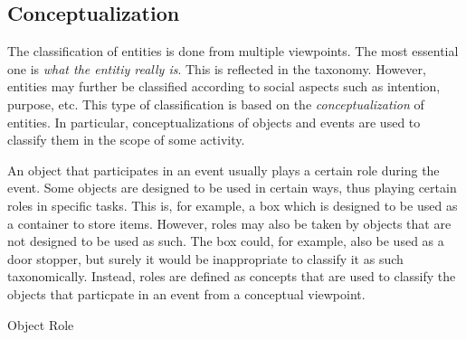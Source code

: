 \subsection{Conceptualization}
\label{sec:classification}

The classification of entities is done from multiple viewpoints.
The most essential one is \emph{what the entitiy really is}.
This is reflected in the taxonomy.
However, entities may further be classified according to social aspects such as intention, purpose, etc.
This type of classification is based on the \emph{conceptualization} of entities.
In particular, conceptualizations of objects and events are used to classify them in the scope of some activity.

An object that participates in an event usually plays a certain role during the event.
Some objects are designed to be used in certain ways, thus playing certain roles in specific tasks.
This is, for example, a box which is designed to be used as a container to store items.
However, roles may also be taken by objects that are not designed to be used as such.
The box could, for example, also be used as a door stopper, but surely it would be
inappropriate to classify it as such taxonomically.
Instead, roles are defined as concepts that are used to classify the objects that particpate in an event from a conceptual viewpoint.

\begin{ODP}{Object Role}
\end{ODP}

